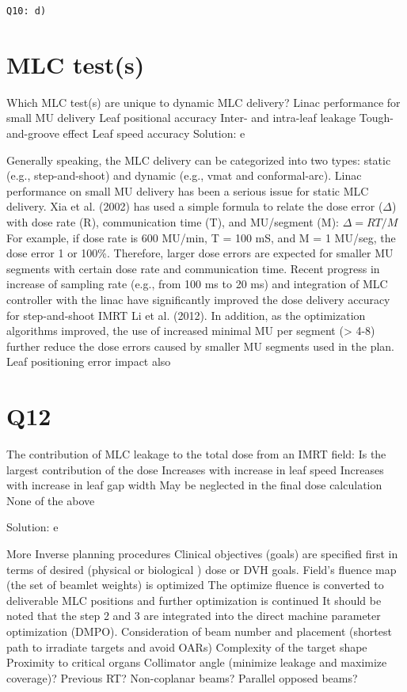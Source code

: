 \documentclass[]{book}
\theoremstyle{definition}
\theoremstyle{definition}
\theoremstyle{definition}
\theoremstyle{remark}
\begin{document}
\texttt{Q10:\ d)}

\section{MLC test(s)}\label{mlc-tests}

Which MLC test(s) are unique to dynamic MLC delivery? Linac performance
for small MU delivery Leaf positional accuracy Inter- and intra-leaf
leakage Tough-and-groove effect Leaf speed accuracy Solution: e

Generally speaking, the MLC delivery can be categorized into two types:
static (e.g., step-and-shoot) and dynamic (e.g., vmat and
conformal-arc). Linac performance on small MU delivery has been a
serious issue for static MLC delivery. Xia et al. (2002) has used a
simple formula to relate the dose error (\(\Delta\)) with dose rate (R),
communication time (T), and MU/segment (M): \(\Delta =RT/M\) For
example, if dose rate is 600 MU/min, T = 100 mS, and M = 1 MU/seg, the
dose error 1 or 100\%. Therefore, larger dose errors are expected for
smaller MU segments with certain dose rate and communication time.
Recent progress in increase of sampling rate (e.g., from 100 ms to 20
ms) and integration of MLC controller with the linac have significantly
improved the dose delivery accuracy for step-and-shoot IMRT Li et al.
(2012). In addition, as the optimization algorithms improved, the use of
increased minimal MU per segment (\textgreater{} 4-8) further reduce the
dose errors caused by smaller MU segments used in the plan. Leaf
positioning error impact also

\section{Q12}\label{q12}

The contribution of MLC leakage to the total dose from an IMRT field: Is
the largest contribution of the dose Increases with increase in leaf
speed Increases with increase in leaf gap width May be neglected in the
final dose calculation None of the above

Solution: e

More Inverse planning procedures Clinical objectives (goals) are
specified first in terms of desired (physical or biological ) dose or
DVH goals. Field's fluence map (the set of beamlet weights) is optimized
The optimize fluence is converted to deliverable MLC positions and
further optimization is continued It should be noted that the step 2 and
3 are integrated into the direct machine parameter optimization (DMPO).
Consideration of beam number and placement (shortest path to irradiate
targets and avoid OARs) Complexity of the target shape Proximity to
critical organs Collimator angle (minimize leakage and maximize
coverage)? Previous RT? Non-coplanar beams? Parallel opposed beams?
\end{document}
